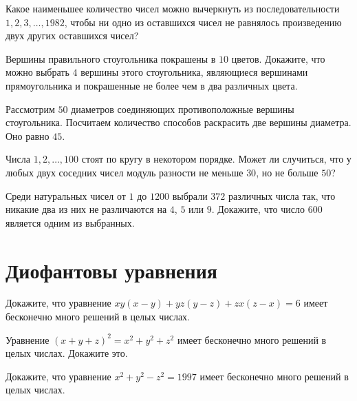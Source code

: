 \documentclass[12pt]{book}
\begin{document}
\begin{task} Какое наименьшее количество чисел можно вычеркнуть из последовательности $1, 2, 3, \dots, 1982$, чтобы ни одно из оставшихся чисел не равнялось произведению двух других оставшихся чисел?
\end{task}

\begin{task} Вершины правильного стоугольника покрашены в $10$ цветов. Докажите, что можно выбрать $4$ вершины этого стоугольника, являющиеся вершинами прямоугольника и покрашенные не более чем в два различных цвета.
\end{task}

\begin{solution}
Рассмотрим $50$ диаметров соединяющих противоположные вершины стоугольника. Посчитаем количество способов раскрасить две вершины диаметра. Оно равно $45$. 
\end{solution}

\begin{task} Числа $1, 2, \dots, 100$ стоят по кругу в некотором порядке. Может ли случиться, что у любых двух соседних чисел модуль разности не меньше $30$, но не больше $50$?
\end{task}

\begin{task}
Среди натуральных чисел от $1$ до $1200$ выбрали $372$ различных числа так, что никакие два из них не различаются на $4$, $5$ или $9$. Докажите, что число $600$ является одним из выбранных. 
\end{task}


\section*{Диофантовы уравнения}

\begin{task}
Докажите, что уравнение $xy(x-y)+yz(y-z)+zx(z-x) = 6$ имеет бесконечно много решений в целых числах.
\end{task}

\begin{task}
Уравнение $(x + y + z)^{2} = x^{2} + y^{2} + z^{2}$ имеет бесконечно много решений в целых числах. Докажите это.
\end{task}

\begin{task}
Докажите, что уравнение $x^{2} + y^{2} - z^{2} = 1997$ имеет бесконечно много решений в целых числах.
\end{task}
\end{document}
